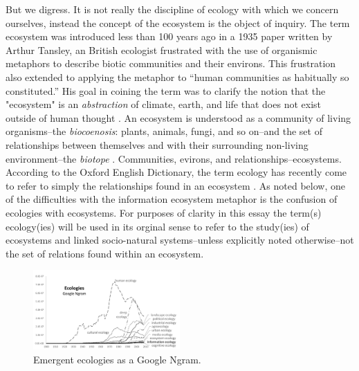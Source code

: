 But we digress. It is not really the discipline of ecology with which we concern ourselves, instead the concept of the ecosystem is the object of inquiry. The term ecosystem was introduced less than 100 years ago in a 1935 paper written by Arthur Tansley, an British ecologist frustrated with the use of organismic metaphors to describe biotic communities and their environs. This frustration also extended to applying the metaphor to “human communities as habitually so constituted.” His goal in coining the term was to clarify the notion that the "ecosystem" is an \textit{abstraction} of climate, earth, and life that does not exist outside of human thought \cite{tansley_1935}. An ecosystem is understood as a community of living organisms--the \textit{biocoenosis}: plants, animals, fungi, and so on--and the set of relationships between themselves and with their surrounding non-living environment--the \textit{biotope} \cite{tansley_1935, odum_1953}. Communities, evirons, and relationships--ecosystems. According to the Oxford English Dictionary, the term ecology has recently come to refer to simply the relationships found in an ecosystem \cite{oed_2008}. As noted below, one of the difficulties with the information ecosystem metaphor is the confusion of ecologies with ecosystems. For purposes of clarity in this essay the term(s) ecology(ies) will be used in its orginal sense to refer to the study(ies) of ecosystems and linked socio-natural systems--unless explicitly noted otherwise--not the set of relations found within an ecosystem. 

\begin{figure}[!ht]
  \centering
    \includegraphics[width=0.5\textwidth]{figures/ecologiesAll}
  \caption{Emergent ecologies as a Google Ngram.}
\end{figure}

